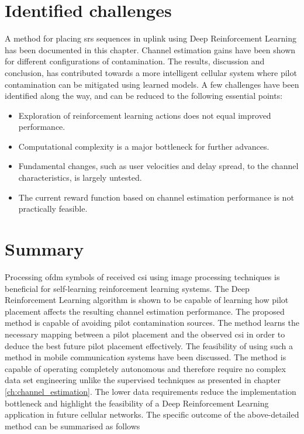 \section{Identified challenges}\label{sec:RL_challenges}
A method for placing \gls{srs} sequences in uplink using Deep Reinforcement Learning has been documented in this chapter. Channel estimation gains have been shown for different configurations of contamination. The results, discussion and conclusion, has contributed towards a more intelligent cellular system where pilot contamination can be mitigated using learned models. A few challenges have been identified along the way, and can be reduced to the following essential points:

\begin{itemize}
    \item Exploration of reinforcement learning actions does not equal improved performance.
    \item Computational complexity is a major bottleneck for further advances.
    \item Fundamental changes, such as user velocities and delay spread, to the channel characteristics, is largely untested.
    \item The current reward function based on channel estimation performance is not practically feasible.
\end{itemize}


\section{Summary}\label{sec:RL_summary}
Processing \gls{ofdm} symbols of received \gls{csi} using image processing techniques is beneficial for self-learning reinforcement learning systems. The Deep Reinforcement Learning algorithm is shown to be capable of learning how pilot placement affects the resulting channel estimation performance. The proposed method is capable of avoiding pilot contamination sources. The method learns the necessary mapping between a pilot placement and the observed \gls{csi} in order to deduce the best future pilot placement effectively. The feasibility of using such a method in mobile communication systems have been discussed. The method is capable of operating completely autonomous and therefore require no complex data set engineering unlike the supervised techniques as presented in chapter \ref{ch:channel_estimation}. The lower data requirements reduce the implementation bottleneck and highlight the feasibility of a Deep Reinforcement Learning application in future cellular networks. The specific outcome of the above-detailed method can be summarised as follows

